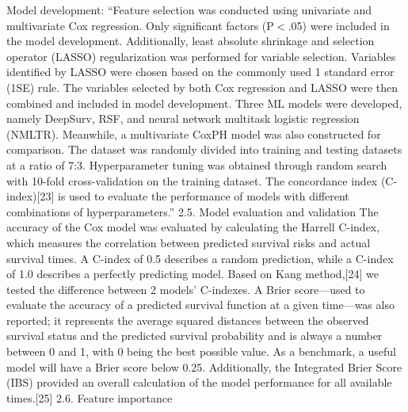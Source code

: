\documentclass{article}%
\begin{document}
\newline%
\newline%
%
%
\newline%
\newline%
%
Model development: “Feature selection was conducted using univariate and multivariate Cox regression. Only significant factors (P < .05) were included in the model development. Additionally, least absolute shrinkage and selection operator (LASSO) regularization was performed for variable selection. Variables identified by LASSO were chosen based on the commonly used 1 standard error (1SE) rule. The variables selected by both Cox regression and LASSO were then combined and included in model development. Three ML models were developed, namely DeepSurv, RSF, and neural network multitask logistic regression (NMLTR). Meanwhile, a multivariate CoxPH model was also constructed for comparison. The dataset was randomly divided into training and testing datasets at a ratio of 7:3. Hyperparameter tuning was obtained through random search with 10{-}fold cross{-}validation on the training dataset. The concordance index (C{-}index){[}23{]} is used to evaluate the performance of models with different combinations of hyperparameters.”%
\newline%
\newline%
%
2.5. Model evaluation and validation%
\newline%
\newline%
%
The accuracy of the Cox model was evaluated by calculating the Harrell C{-}index, which measures the correlation between predicted survival risks and actual survival times. A C{-}index of 0.5 describes a random prediction, while a C{-}index of 1.0 describes a perfectly predicting model. Based on Kang method,{[}24{]} we tested the difference between 2 models’ C{-}indexes. A Brier score—used to evaluate the accuracy of a predicted survival function at a given time—was also reported; it represents the average squared distances between the observed survival status and the predicted survival probability and is always a number between 0 and 1, with 0 being the best possible value. As a benchmark, a useful model will have a Brier score below 0.25. Additionally, the Integrated Brier Score (IBS) provided an overall calculation of the model performance for all available times.{[}25{]}%
\newline%
\newline%
%
%
\newline%
\newline%
%
2.6. Feature importance%
\end{document}
